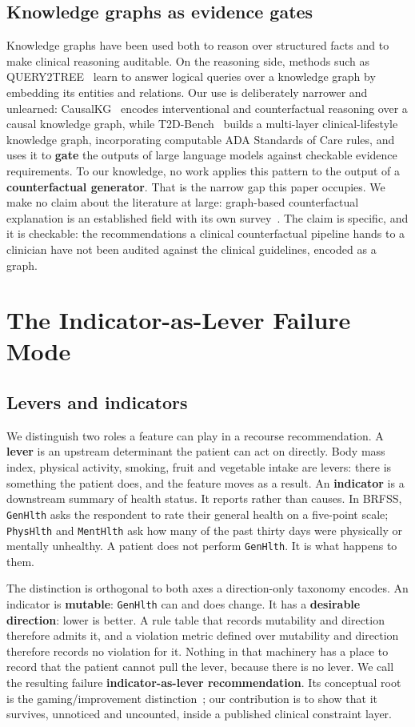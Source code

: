 \documentclass[conference]{IEEEtran}
\begin{document}
\subsection{Knowledge graphs as evidence gates}
Knowledge graphs have been used both to reason over structured facts and to make clinical reasoning auditable. On the reasoning side, methods such as QUERY2TREE~\cite{query2tree2025} learn to answer logical queries over a knowledge graph by embedding its entities and relations. Our use is deliberately narrower and unlearned: CausalKG~\cite{causalkg2022} encodes interventional and counterfactual reasoning over a causal knowledge graph, while T2D-Bench~\cite{t2dbench2026} builds a multi-layer clinical-lifestyle knowledge graph, incorporating computable ADA Standards of Care rules, and uses it to \textbf{gate} the outputs of large language models against checkable evidence requirements. To our knowledge, no work applies this pattern to the output of a \textbf{counterfactual generator}. That is the narrow gap this paper occupies. We make no claim about the literature at large: graph-based counterfactual explanation is an established field with its own survey~\cite{pradoromero2024}. The claim is specific, and it is checkable: the recommendations a clinical counterfactual pipeline hands to a clinician have not been audited against the clinical guidelines, encoded as a graph.

\section{The Indicator-as-Lever Failure Mode}
\subsection{Levers and indicators}
We distinguish two roles a feature can play in a recourse recommendation. A \textbf{lever} is an upstream determinant the patient can act on directly. Body mass index, physical activity, smoking, fruit and vegetable intake are levers: there is something the patient does, and the feature moves as a result. An \textbf{indicator} is a downstream summary of health status. It reports rather than causes. In BRFSS, \texttt{GenHlth} asks the respondent to rate their general health on a five-point scale; \texttt{PhysHlth} and \texttt{MentHlth} ask how many of the past thirty days were physically or mentally unhealthy. A patient does not perform \texttt{GenHlth}. It is what happens to them.

The distinction is orthogonal to both axes a direction-only taxonomy encodes. An indicator is \textbf{mutable}: \texttt{GenHlth} can and does change. It has a \textbf{desirable direction}: lower is better. A rule table that records mutability and direction therefore admits it, and a violation metric defined over mutability and direction therefore records no violation for it. Nothing in that machinery has a place to record that the patient cannot pull the lever, because there is no lever. We call the resulting failure \textbf{indicator-as-lever recommendation}. Its conceptual root is the gaming/improvement distinction~\cite{miller2020,konig2023}; our contribution is to show that it survives, unnoticed and uncounted, inside a published clinical constraint layer.
\end{document}
